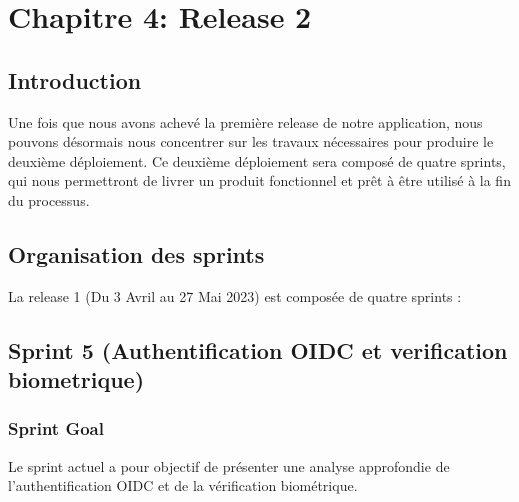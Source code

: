 \chapter*{Chapitre 4: Release 2}
\label{chap:release2}
\setcounter{part}{0}
\setcounter{chapter}{0}
\setcounter{section}{0}
\renewcommand{\thechapter}{\arabic{chapter}}
\renewcommand{\thepart}{\arabic{part}}
\renewcommand{\thesection}{\arabic{section}}

\section*{Introduction}

Une fois que nous avons achevé la première release de notre application, nous pouvons désormais nous concentrer sur les travaux nécessaires pour produire le deuxième déploiement. Ce deuxième déploiement sera composé de quatre sprints, qui nous permettront de livrer un produit fonctionnel et prêt à être utilisé à la fin du processus.

\section{Organisation des sprints}
La release 1 (Du 3 Avril au 27 Mai 2023) est composée de quatre sprints : 



\section{Sprint 5 (Authentification OIDC et verification biometrique)}

\subsection{Sprint Goal}
Le sprint actuel a pour objectif de présenter une analyse approfondie de l'authentification OIDC et de la vérification biométrique.

